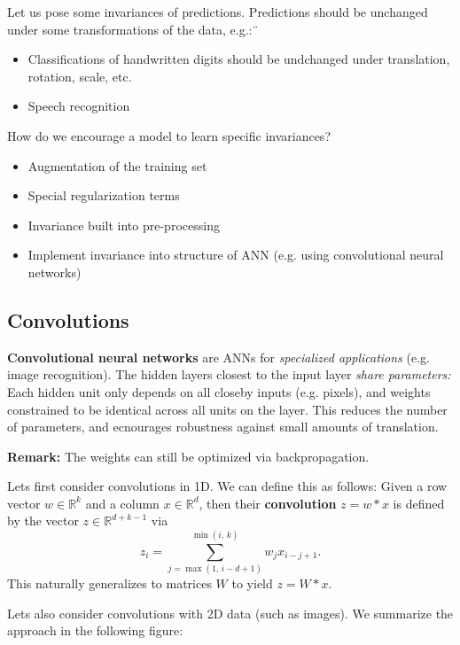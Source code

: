 \documentclass[a4paper]{extarticle}
\begin{document}
Let us pose some invariances of predictions. Predictions should be unchanged under some transformations of the data, e.g.:¨
\begin{itemize}
    \item Classifications of handwritten digits should be undchanged under translation, rotation, scale, etc.
    \item Speech recognition
\end{itemize}

How do we encourage a model to learn specific invariances?
\begin{itemize}
    \item Augmentation of the training set
    \item Special regularization terms
    \item Invariance built into pre-processing
    \item Implement invariance into structure of ANN (e.g. using convolutional neural networks)
\end{itemize}

\subsection{Convolutions}

\textbf{Convolutional neural networks} are ANNs for \textit{specialized applications} (e.g. image recognition). The hidden layers closest to the input layer \textit{share parameters:} Each hidden unit only depends on all closeby inputs (e.g. pixels), and weights constrained to be identical across all units on the layer. This reduces the number of parameters, and ecnourages robustness against small amounts of translation.

\textbf{Remark:} The weights can still be optimized via backpropagation.

Lets first consider convolutions in 1D. We can define this as follows: Given a row vector $w \in \mathbb{R}^k$ and a column $x \in \mathbb{R}^d$, then their \textbf{convolution} $z = w * x$ is defined by the vector $z \in \mathbb{R}^{d + k - 1}$ via
\[
    z_i = \sum_{j = \max(1, \, i - d + 1)}^{\min (i, \, k)} w_jx_{i-j+1}.
\]
This naturally generalizes to matrices $W$ to yield $z = W * x$.

Lets also consider convolutions with 2D data (such as images). We summarize the approach in the following figure:
\end{document}

